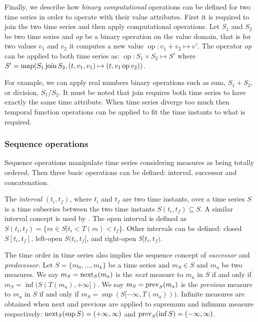 Finally, we describe how \emph{binary computational} operations can be
defined for two time series in order to operate with their value
attributes.  First it is required to join the two time series and then
apply computational operations. Let $S_1$ and $S_2$ be two time series
and \emph{op} be a binary operation on the value domain, that is for
two values $v_1$ and $v_2$ it computes a new value $\operatorname{op}:
v_1 + v_2 \mapsto v'$. The operator \emph{op} can be applied to both
time series as: $\operatorname{op}: S_1 \times S_2 \mapsto S'$ where
$S' = \operatorname*{map}(S_1 \operatorname*{join} S_2, (t,v_1,v_1)\mapsto(t,v_1 \operatorname{op}
v_2))$.

For example, we can apply real numbers binary operations such as sum,
$S_1 + S_2$, or division, $S_1 / S_2$. It must be noted that join
requires both time series to have exactly the same time
attribute. When time series diverge too much then temporal function
operations can be applied to fit the time instants to what is
required.





\subsubsection{Sequence operations}

Sequence operations manipulate time series considering measures as
being totally ordered. Then three basic operations can be defined:
interval, successor and concatenation.


The \emph{interval} $(t_i,t_f)$, where $t_i$ and $t_f$ are two time
instants, over a time series $S$ is a time subseries between the two
time instants $S(t_i,t_f) \subseteq S$. A similar interval concept
is used by \cite{last:hetland}. The open interval is defined as
$S(t_i,t_f)=\{m\in S | t_i<T(m)<t_f\}$. Other intervals can be
defined: closed $S[t_i,t_f]$, left-open $S(t_i,t_f]$, and right-open
$S[t_i,t_f)$.

The time order in time series also implies the sequence concept of
\emph{successor} and \emph{predecessor}.  Let $S=\{m_0, \ldots, m_k\}$
be a time series and $m_S\in S$ and $m_a$ be two measures. We say
$m_S=\operatorname*{next}_S(m_a)$ is the \emph{next} measure to $m_a$ in $S$ if and
only if $m_S=\inf(S(T(m_a),+\infty])$.  We say $m_S=\operatorname*{prev}_S(m_a)$ is
the \emph{previous} measure to $m_a$ in $S$ if and only if
$m_S=\sup(S[-\infty,T(m_a)))$. %
Infinite measures are obtained when next and previous are applied to
supremum and infimum measure respectively: $\operatorname*{next}_S(\sup
S)=(+\infty,\infty)$ and $\operatorname*{prev}_S(\inf S)=(-\infty,\infty)$.



